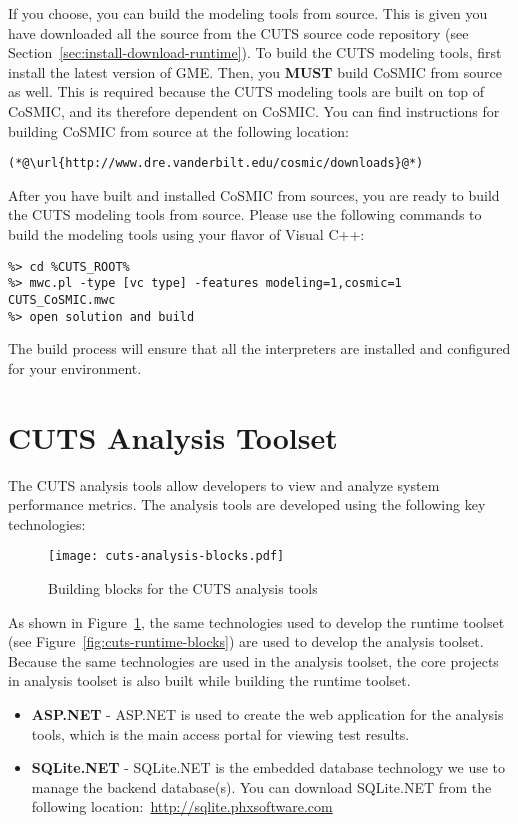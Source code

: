 If you choose, you can build the modeling tools from source. This is given you
have downloaded all the source from the CUTS source code repository (see 
Section~\ref{sec:install-download-runtime}). To build the CUTS modeling tools,
first install the latest version of GME. Then, you \textbf{MUST} build CoSMIC
from source as well. This is required because the CUTS modeling tools are
built on top of CoSMIC, and its therefore dependent on CoSMIC. You can find
instructions for building CoSMIC from source at the following location:
\begin{lstlisting}
(*@\url{http://www.dre.vanderbilt.edu/cosmic/downloads}@*)
\end{lstlisting}
After you have built and installed CoSMIC from sources, you are ready to build
the CUTS modeling tools from source. Please use the following commands to 
build the modeling tools using your flavor of Visual C++:
\begin{lstlisting}
%> cd %CUTS_ROOT%
%> mwc.pl -type [vc type] -features modeling=1,cosmic=1 CUTS_CoSMIC.mwc
%> open solution and build
\end{lstlisting}
The build process will ensure that all the interpreters are installed
and configured for your environment.

\section{CUTS Analysis Toolset}

The CUTS analysis tools allow developers to view and analyze system
performance metrics. The analysis tools are developed using the following
key technologies:
\begin{figure}[htbp]
  \centering
  \texttt{[image: cuts-analysis-blocks.pdf]}
  \caption{Building blocks for the CUTS analysis tools}
  \label{fig:cuts-analysis-blocks}
\end{figure}

As shown in Figure~\ref{fig:cuts-analysis-blocks}, the same technologies 
used to develop the runtime toolset (see Figure~\ref{fig:cuts-runtime-blocks}) 
are used to develop the analysis toolset. Because the same technologies 
are used in the analysis toolset, the core projects in analysis toolset 
is also built while building the runtime toolset.
\iffalse
\begin{itemize}
  \item \textbf{ASP.NET} - ASP.NET is used to create the web application
  for the analysis tools, which is the main access portal for viewing 
  test results.

  \item \textbf{SQLite.NET} - SQLite.NET is the embedded database technology
  we use to manage the backend database(s). You can download SQLite.NET
  from the following location:~\url{http://sqlite.phxsoftware.com}
\end{itemize}

